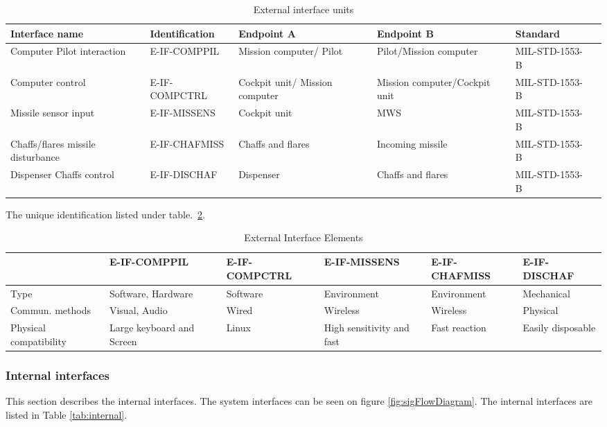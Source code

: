 \begin{center}
\begin{table}[h]
\caption{External interface units}
\label{tab:External}
\begin{tabular}{ | p{2cm} | l | p{2.3cm} | p{2.3cm} | l | p{1cm} |}
\hline
\textbf{Interface name} & \textbf{Identification} & \textbf{Endpoint A} & \textbf{Endpoint B} & \textbf{Standard}\\ \hline
Computer Pilot interaction & E-IF-COMPPIL & Mission computer/ Pilot & Pilot/Mission computer &MIL-STD-1553-B \\ \hline
Computer control & E-IF-COMPCTRL & Cockpit unit/ Mission computer &Mission computer/Cockpit unit &MIL-STD-1553-B \\ \hline
Missile sensor input & E-IF-MISSENS & Cockpit unit & MWS &MIL-STD-1553-B \\ \hline
Chaffs/flares missile disturbance& E-IF-CHAFMISS & Chaffs and flares & Incoming missile &MIL-STD-1553-B\\ \hline
Dispenser Chaffs control & E-IF-DISCHAF & Dispenser & Chaffs and flares &MIL-STD-1553-B \\ \hline
\end{tabular}
\end{table}
\end{center}

 The unique identification listed under table.~\ref{tab:External2}. 
 \begin{table}[h]
 \caption{External Interface Elements}
 \label{tab:External2}
 \begin{tabular}{| p{1.5cm} | p{2.3cm} p{2cm} p{2.3cm} p{2.3cm} p{2.3cm} |}
 \hline
&E-IF-COMPPIL&E-IF-COMPCTRL&E-IF-MISSENS&E-IF-CHAFMISS&E-IF-DISCHAF\\
\hline
 Type&Software, Hardware&Software&Environment&Environment&Mechanical\\
 \hline
 Commun. methods&Visual, Audio&Wired&Wireless&Wireless&Physical\\
 \hline
 Physical compatibility&Large keyboard and Screen&Linux&High sensitivity and fast&Fast reaction&Easily disposable\\
 \hline
 \end{tabular}
 \end{table}

\clearpage
  \subsubsection{Internal interfaces}
This section describes the internal interfaces. The system interfaces can be seen on figure \ref{fig:sigFlowDiagram}. The internal interfaces are listed in Table \ref{tab:internal}.

